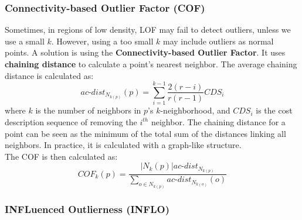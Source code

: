 \subsubsection{Connectivity-based Outlier Factor (COF)}

Sometimes, in regions of low density, LOF may fail to detect outliers, unless we use a small $k$. However, using a too small $k$ may include outliers as normal points. A solution is using the \textbf{Connectivity-based Outlier Factor}. It uses \textbf{chaining distance} to calculate a point's nearest neighbor. The average chaining distance is calculated as:
\begin{equation*}
    \textit{ac-dist}_{N_{k(p)}}(p) = \sum_{i=1}^{k-1} \dfrac{2(r-i)}{r(r-1)} CDS_i
\end{equation*}
where $k$ is the number of neighbors in $p$'s $k$-neighborhood, and $CDS_i$ is the cost description sequence of removing the $i^{th}$ neighbor. The chaining distance for a point can be seen as the minimum of the total sum of the distances linking all neighbors. In practice, it is calculated with a graph-like structure. \\
The COF is then calculated as:
\begin{equation*}
    \textit{COF}_k(p) = \dfrac{|N_k(p)| \textit{ac-dist}_{N_{k(p)}}}{\sum_{o \in N_{k(p)}} \textit{ac-dist}_{N_{k(o)}}(o)}
\end{equation*}

\subsubsection{INFLuenced Outlierness (INFLO)}

